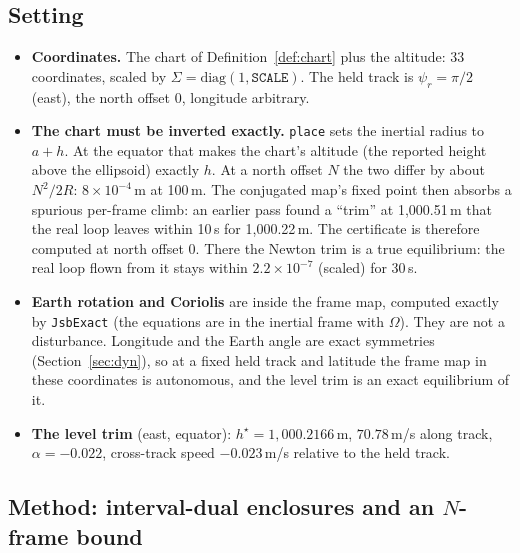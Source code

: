 \documentclass[11pt]{article}
\begin{document}
\subsection{Setting}

\begin{itemize}
\item \textbf{Coordinates.} The chart of Definition~\ref{def:chart} plus the altitude: 33 coordinates, scaled by $\Sigma = \mathrm{diag}(1, \texttt{SCALE})$. The held track is $\psi_r = \pi/2$ (east), the north offset 0, longitude arbitrary.
\item \textbf{The chart must be inverted exactly.} \texttt{place} sets the inertial radius to $a + h$. At the equator that makes the chart's altitude (the reported height above the ellipsoid) exactly $h$. At a north offset $N$ the two differ by about $N^2/2R$: $8\times10^{-4}$\,m at 100\,m. The conjugated map's fixed point then absorbs a spurious per-frame climb: an earlier pass found a ``trim'' at 1{,}000.51\,m that the real loop leaves within 10\,s for 1{,}000.22\,m. The certificate is therefore computed at north offset 0. There the Newton trim is a true equilibrium: the real loop flown from it stays within $2.2\times10^{-7}$ (scaled) for 30\,s.
\item \textbf{Earth rotation and Coriolis} are inside the frame map, computed exactly by \texttt{JsbExact} (the equations are in the inertial frame with $\Omega$). They are not a disturbance. Longitude and the Earth angle are exact symmetries (Section~\ref{sec:dyn}), so at a fixed held track and latitude the frame map in these coordinates is autonomous, and the level trim is an exact equilibrium of it.
\item \textbf{The level trim} (east, equator): $h^\star = 1{,}000.2166$\,m, $70.78$\,m/s along track, $\alpha = -0.022$, cross-track speed $-0.023$\,m/s relative to the held track.
\end{itemize}

\subsection{Method: interval-dual enclosures and an $N$-frame bound}
\end{document}
